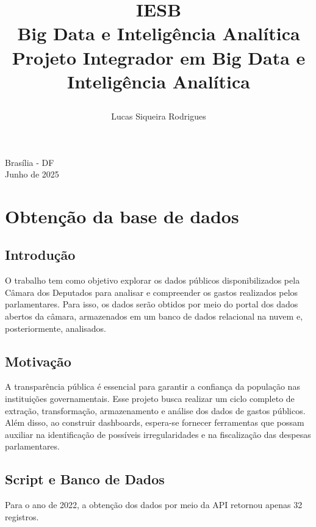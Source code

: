 \documentclass[12pt, a4paper]{article}
\title{
    \textbf{IESB} \\
    \large Big Data e Inteligência Analítica \\
    \vspace{10cm}
    \textbf{Projeto Integrador em Big Data e Inteligência Analítica}
    \author{Lucas Siqueira Rodrigues}
    \date{}
}
\begin{document}
\begin{titlepage} 
    \maketitle
    \begin{center}
        \vspace{\fill}
        Brasília - DF \\
        Junho de 2025
    \end{center}
\end{titlepage}

\section{Obtenção da base de dados}
\subsection{Introdução}
O trabalho tem como objetivo explorar os dados públicos disponibilizados pela Câmara dos Deputados para analisar e compreender os gastos realizados pelos parlamentares. Para isso, os dados serão obtidos por meio do portal dos dados abertos da câmara\cite{dados_abertos}, armazenados em um banco de dados relacional na nuvem e, posteriormente, analisados.

\subsection{Motivação}
A transparência pública é essencial para garantir a confiança da população nas instituições governamentais. Esse projeto busca realizar um ciclo completo de extração, transformação, armazenamento e análise dos dados de gastos públicos. Além disso, ao construir dashboards, espera-se fornecer ferramentas que possam auxiliar na identificação de possíveis irregularidades e na fiscalização das despesas parlamentares.


\subsection{Script e Banco de Dados}
Para o ano de 2022, a obtenção dos dados por meio da API\cite{dados_abertos} retornou apenas 32 registros.
\end{document}
